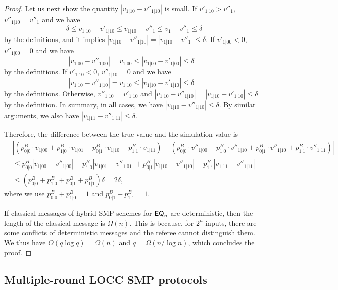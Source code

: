 \begin{proof}
    Let us next show the quantity $|v_{1|10} - v''_{1|10}|$ is small. If $v'_{1|10} > v''_1$, $v''_{1|10} = v''_1$ and we have
    \[
         - \delta \leq v_{1|10} - v'_{1|10} \leq v_{1|10} - v''_{1} \leq v_{1} - v''_{1} \leq \delta
    \]
    by the definitions, and it implies $|v_{1|10} - v''_{1|10}| = |v_{1|10} - v''_1| \leq \delta$. If $v'_{1|00} < 0$, $v''_{1|00} = 0$ and we have
    \[
        |v_{1|00} - v''_{1|00}| =  v_{1|00} \leq |v_{1|00} - v'_{1|00}| \leq \delta
    \]
    by the definitions.
    If $v'_{1|10} < 0$, $v''_{1|10} = 0$ and we have
    \[
        |v_{1|10} - v''_{1|10}| =  v_{1|10} \leq |v_{1|10} - v'_{1|10}| \leq \delta
    \]
    by the definitions.
    Otherwise, $v''_{1|10} = v'_{1|10}$ and $|v_{1|10} - v''_{1|10}| = |v_{1|10} - v'_{1|10}| \leq \delta$ by the definition. In summary, in all cases, we have $|v_{1|10} - v''_{1|10}| \leq \delta$. By similar arguments, we also have $|v_{1|11} - v''_{1|11}| \leq \delta$.
    
    Therefore, the difference between the true value and the simulation value is
    \begin{align*}
        &|(p_{0|0}^B \cdot v_{1|00} + p_{1|0}^B \cdot v_{1|01} + p_{0|1}^B \cdot v_{1|10} + p_{1|1}^B \cdot v_{1|11}) - (p_{0|0}^B \cdot v''_{1|00} +p_{1|0}^B \cdot v''_{1|10} + p_{0|1}^B \cdot v''_{1|10} + p_{1|1}^B \cdot v''_{1|11})| \\
        & \leq p_{0|0}^B |v_{1|00} - v''_{1|00}| + p_{1|0}^B |v_{1|01} - v''_{1|01}| + p_{0|1}^B |v_{1|10} - v''_{1|10}| + p_{1|1}^B |v_{1|11} - v''_{1|11}| \\
        & \leq (p_{0|0}^B + p^B_{1|0} + p^B_{0|1} + p^B_{1|1}) \delta = 2 \delta,
    \end{align*}
    where we use $p_{0|0}^B + p^B_{1|0} = 1$ and $p^B_{0|1} + p^B_{1|1} = 1$.
    
    If classical messages of hybrid SMP schemes for $\mathsf{EQ}_n$ are deterministic, then the length of the classical message is $\Omega(n)$. This is because, for $2^n$ inputs, there are some conflicts of deterministic messages and the referee cannot distinguish them. We thus have $O(q \log q) = \Omega(n)$ and $q = \Omega(n/\log n)$, which concludes the proof.
\end{proof}

\subsection{Multiple-round LOCC SMP protocols}\label{subsec:many_rounds}

